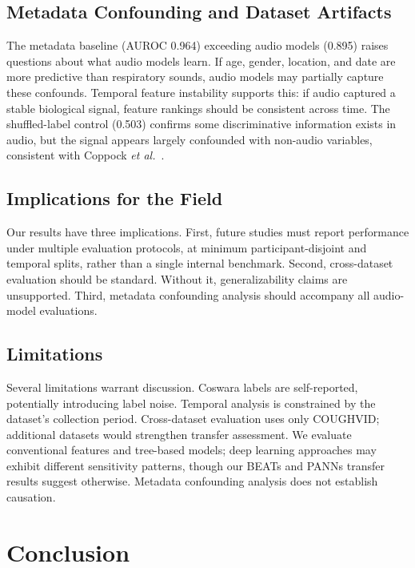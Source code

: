 \documentclass[conference]{IEEEtran}
\begin{document}
\subsection{Metadata Confounding and Dataset Artifacts}

The metadata baseline (AUROC 0.964) exceeding audio models (0.895) raises questions about what audio models learn. If age, gender, location, and date are more predictive than respiratory sounds, audio models may partially capture these confounds. Temporal feature instability supports this: if audio captured a stable biological signal, feature rankings should be consistent across time. The shuffled-label control (0.503) confirms some discriminative information exists in audio, but the signal appears largely confounded with non-audio variables, consistent with Coppock \emph{et al.}~\cite{coppock2024}.

\subsection{Implications for the Field}

Our results have three implications. First, future studies must report performance under multiple evaluation protocols, at minimum participant-disjoint and temporal splits, rather than a single internal benchmark. Second, cross-dataset evaluation should be standard. Without it, generalizability claims are unsupported. Third, metadata confounding analysis should accompany all audio-model evaluations.

\subsection{Limitations}

Several limitations warrant discussion. Coswara labels are self-reported, potentially introducing label noise. Temporal analysis is constrained by the dataset's collection period. Cross-dataset evaluation uses only COUGHVID; additional datasets would strengthen transfer assessment. We evaluate conventional features and tree-based models; deep learning approaches may exhibit different sensitivity patterns, though our BEATs and PANNs transfer results suggest otherwise. Metadata confounding analysis does not establish causation.

\section{Conclusion}
\label{sec:conclusion}
\end{document}
